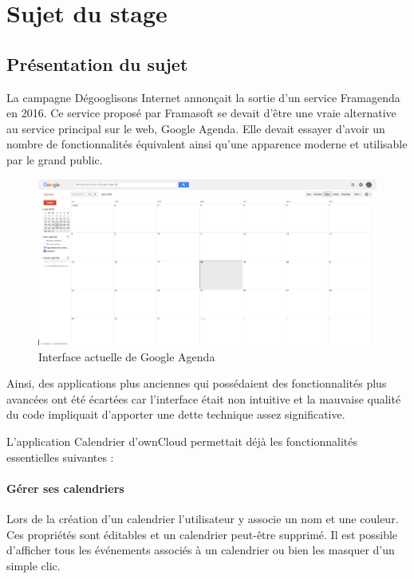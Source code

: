 \documentclass[10pt,a4paper, twoside]{report}
\begin{document}
	\chapter{Sujet du stage}
	
	\section{Présentation du sujet}
	
	La campagne Dégooglisons Internet annonçait la sortie d'un service Framagenda en 2016. Ce service proposé par Framasoft se devait d'être une vraie alternative au service principal sur le web, Google Agenda. Elle devait essayer d'avoir un nombre de fonctionnalités équivalent ainsi qu'une apparence moderne et utilisable par le grand public.
	
	\begin{figure}[ht]
		\centering
		\centerline{\includegraphics[width=1.5\textwidth]{images/google-agenda-interface-actuelle.png}}
		\caption{Interface actuelle de Google Agenda}
		\label{normal_case}
	\end{figure}
	
	Ainsi, des applications plus anciennes qui possédaient des fonctionnalités plus avancées ont été écartées car l'interface était non intuitive et la mauvaise qualité du code impliquait d'apporter une dette technique assez significative.
	
	L'application Calendrier d'ownCloud permettait déjà les fonctionnalités essentielles suivantes :
	
	\subsubsection{Gérer ses calendriers}
	Lors de la création d'un calendrier l'utilisateur y associe un nom et une couleur. Ces propriétés sont éditables et un calendrier peut-être supprimé. Il est possible d'afficher tous les événements associés à un calendrier ou bien les masquer d'un simple clic.
	
\end{document}
